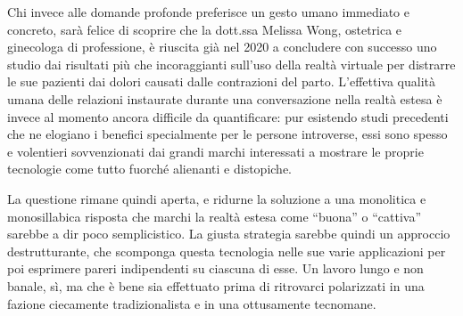 \documentclass{article}
\begin{document}
Chi invece alle domande profonde preferisce un gesto umano immediato e concreto,
sarà felice di scoprire che la dott.ssa Melissa Wong, ostetrica e ginecologa di
professione, è riuscita già nel 2020 a concludere con successo uno studio dai
risultati più che incoraggianti sull'uso della realtà virtuale per distrarre le
sue pazienti dai dolori causati dalle contrazioni del parto. L'effettiva qualità
umana delle relazioni instaurate durante una conversazione nella realtà estesa
è invece al momento ancora difficile da quantificare: pur esistendo studi
precedenti che ne elogiano i benefici specialmente per le persone introverse,
essi sono spesso e volentieri sovvenzionati dai grandi marchi interessati a
mostrare le proprie tecnologie come tutto fuorché alienanti e distopiche.

La questione rimane quindi aperta, e ridurne la soluzione a una monolitica e
monosillabica risposta che marchi la realtà estesa come ``buona'' o ``cattiva''
sarebbe a dir poco semplicistico. La giusta strategia sarebbe quindi un
approccio destrutturante, che scomponga questa tecnologia nelle sue varie
applicazioni per poi esprimere pareri indipendenti su ciascuna di esse. Un
lavoro lungo e non banale, sì, ma che è bene sia effettuato prima di ritrovarci
polarizzati in una fazione ciecamente tradizionalista e in una ottusamente
tecnomane.
\end{document}
